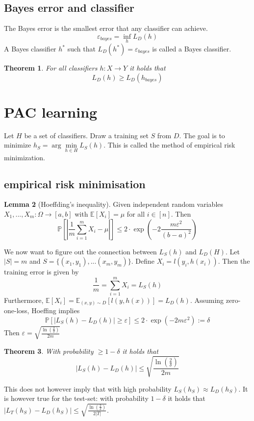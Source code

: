 \documentclass[a4paper, 12pt]{article}
\theoremstyle{plain}
\newtheorem{theorem}{Theorem}[subsection] %
\theoremstyle{definition}
\theoremstyle{lemma}
\newtheorem{lemma}[theorem]{Lemma}
\theoremstyle{remark}
\theoremstyle{example}
\begin{document}
	\subsection{Bayes error and classifier}
	The Bayes error is the smallest error that any classifier can achieve.
	\[\varepsilon_{bayes} = \inf\limits_{h} L_D(h)\] A Bayes classifier $h^*$ such that $L_D(h^*) = \varepsilon_{bayes}$ is called a Bayes classifier.
	\begin{theorem}
		For all classifiers $h: X \to Y$ it holds that \[L_D(h) \geq L_D(h_{bayes})\]
	\end{theorem}
	
	\section{PAC learning}
	Let $H$ be a set of classifiers. Draw a training set $S$ from $D$. The goal is to minimize $h_S = \arg\min\limits_{h \in H}L_S(h)$. This is called the method of empirical risk minimization.
	\subsection{empirical risk minimisation}
	\begin{lemma}[Hoeffding's inequality]
		Given independent random variables $X_1,...,X_m: \Omega \to [a,b]$ with $\mathbb{E}[X_i] = \mu$ for all $i\in[n]$.
		Then $$\mathbb{P}\left[\left|\frac{1}{m}\sum_{i=1}^m X_i-\mu\right|\right] \leq 2\cdot \exp\left(-2\frac{m\varepsilon^2}{(b-a)^2}\right)$$
	\end{lemma}
	We now want to figure out the connection between $L_S(h)$ and $L_D(H)$. Let $\left|S\right| = m$ and $S = \{(x_1,y_1), ... (x_m,y_m)\}$. Define $X_i = l(y_i,h(x_i))$. Then the training error is given by \[\frac{1}{m} = \sum_{i=1}^m X_i = L_S(h)\]
	Furthermore, $\mathbb{E}[X_i] = \mathbb{E}_{(x,y) \sim D}[l(y,h(x))] = L_D(h)$. Assuming zero-one-loss, Hoeffing implies \[\mathbb{P}[\left|L_S(h) - L_D(h)\right| \geq \varepsilon] \leq 2\cdot \exp(-2m\varepsilon^2) := \delta\]
	Then $\varepsilon = \sqrt{\frac{\ln(\frac{2}{\delta})}{2m}}$
	\begin{theorem}
		With probability $\geq 1-\delta$ it holds that \[\left|L_S(h) - L_D(h)\right| \leq \sqrt{\frac{\ln(\frac{2}{\delta})}{2m}}\]
	\end{theorem}
	This does not however imply that with high probability $L_S(h_S)\approx L_D(h_S)$. It is however true for the test-set: with probability $1-\delta$ it holds that $\left|L_T(h_S)-L_D(h_S)\right| \leq \sqrt{\frac{\ln(\frac{2}{\delta})}{2\left|T\right|}}$.
	
\end{document}
